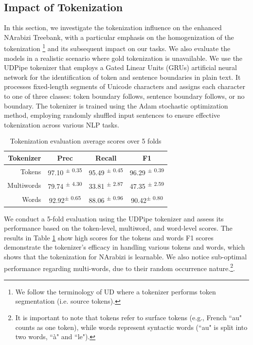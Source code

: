\documentclass[11pt]{article}
\begin{document}
\subsection{Impact of Tokenization}
In this section, we investigate the tokenization influence on the enhanced NArabizi Treebank, with a particular emphasis on the homogenization of the tokenization \footnote{We follow the  terminology of UD where a tokenizer performs token segmentation (i.e. source tokens).} and its subsequent impact on our tasks. We also evaluate the models in a realistic scenario where gold tokenization is unavailable. We use the UDPipe tokenizer \cite{straka-etal-2016-udpipe} that employs a Gated Linear Units (GRUs) \cite{cho-etal-2014-learning} artificial neural network for the identification of token and sentence boundaries in plain text. It processes fixed-length segments of Unicode characters and assigns each character to one of three classes: token boundary follows, sentence boundary follows, or no boundary. The tokenizer is trained using the Adam stochastic optimization method, employing randomly shuffled input sentences to ensure effective tokenization across various NLP tasks. 
\begin{table}[h!]
\begin{center}
{\footnotesize
\begin{tabular}{rccc}
\toprule
{ Tokenizer} & { Prec} & { Recall} & { F1} \\
\hline
\rule{0pt}{2.5ex}Tokens & 97.10 \textsuperscript{$\pm$ 0.35} & 95.49 \textsuperscript{$\pm$ 0.45}& 96.29 \textsuperscript{$\pm$ 0.39}\\
Multiwords & 79.74 \textsuperscript{$\pm$ 4.30}& 33.81 \textsuperscript{$\pm$ 2.87}& 47.35 \textsuperscript{$\pm$ 2.59}\\
Words & 92.92\textsuperscript{$\pm$ 0.65} & 88.06 \textsuperscript{$\pm$ 0.96}& 90.42\textsuperscript{$\pm$ 0.80} \\
\bottomrule
\end{tabular}

\caption{Tokenization evaluation average scores over 5 folds }
\label{tab:tokenization_eval}
}%
\end{center}
\end{table}

We conduct a 5-fold evaluation using the UDPipe tokenizer and assess its performance based on the token-level, multiword, and word-level scores. The results in Table \ref{tab:tokenization_eval} show high scores for the tokens and words F1 scores demonstrate the tokenizer's efficacy in handling various tokens and words, which shows that the tokenization for NArabizi is learnable. We also notice sub-optimal performance regarding multi-words, due to their random occurrence nature.\footnote{It is important to note that tokens refer to surface tokens (e.g., French ``au" counts as one token), while words represent syntactic words (``au" is split into two words, ``à" and ``le").}.
\end{document}
